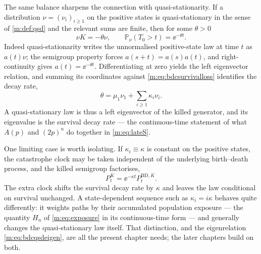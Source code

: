 The same balance sharpens the connection with quasi-stationarity. If a distribution
$\nu = (\nu_i)_{i\ge1}$ on the positive states is quasi-stationary in the sense of
\cref{m:def:qsd} and the relevant sums are finite, then for some $\theta>0$
\begin{equation}
\label{m:eq:bdcqsdeigen}
\nu K = -\theta\nu,
\qquad
\mathbb{P}_\nu\!\left(T_0>t\right) = \ee^{-\theta t} .
\end{equation}
Indeed quasi-stationarity writes the unnormalised positive-state law at time $t$ as
$a(t)\nu$; the semigroup property forces $a(s+t) = a(s)a(t)$, and right-continuity
gives $a(t)=\ee^{-\theta t}$. Differentiating at zero yields the left eigenvector
relation, and summing its coordinates against \cref{m:eq:bdcsurvivalloss} identifies
the decay rate,
\begin{equation}
\label{m:eq:bdcdecayrate}
\theta = \mu_1\nu_1 + \sum_{i\ge1}\kappa_i\nu_i .
\end{equation}
A quasi-stationary law is thus a left eigenvector of the killed generator, and its
eigenvalue is the survival decay rate --- the continuous-time statement of what
$A(p)$ and $(2p)^n$ do together in \cref{m:eq:lateS}.

One limiting case is worth isolating. If $\kappa_i\equiv\kappa$ is constant on the
positive states, the catastrophe clock may be taken independent of the underlying
birth--death process, and the killed semigroup factorises,
\begin{equation}
\label{m:eq:constantcatastrophe}
P^K_t = \ee^{-\kappa t}P^{\mathrm{BD},K}_t .
\end{equation}
The extra clock shifts the survival decay rate by $\kappa$ and leaves the law
conditional on survival unchanged. A state-dependent sequence such as
$\kappa_i = i\kappa$ behaves quite differently: it weights paths by their
accumulated population exposure --- the quantity $H_n$ of \cref{m:eq:exposure} in
its continuous-time form --- and generally changes the quasi-stationary law itself.
That distinction, and the eigenrelation \cref{m:eq:bdcqsdeigen}, are all the present
chapter needs; the later chapters build on both.

\FloatBarrier
